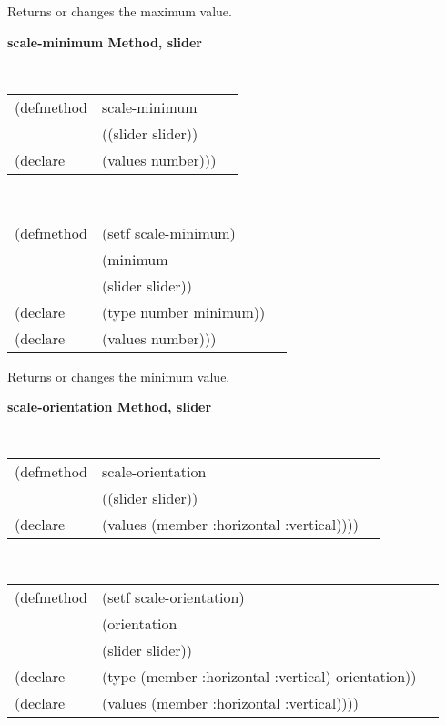 \begin{flushright} \parbox[t]{6.125in}{
Returns or changes the maximum value.}
\end{flushright}




{\samepage  
{\large {\bf scale-minimum \hfill Method, slider}}
\begin{flushright} \parbox[t]{6.125in}{
\tt
\begin{tabular}{lll}
\raggedright
(defmethod & scale-minimum & \\
& ((slider  slider)) \\
(declare & (values number)))
\end{tabular}
\rm

}\end{flushright}}

\begin{flushright} \parbox[t]{6.125in}{
\tt
\begin{tabular}{lll}
\raggedright
(defmethod & (setf scale-minimum) & \\
         & (minimum \\
         & (slider  slider)) \\
(declare &(type number  minimum))\\
(declare & (values number)))
\end{tabular}
\rm}
\end{flushright}

\begin{flushright} \parbox[t]{6.125in}{
Returns or changes the minimum value.}
\end{flushright}




{\samepage  
{\large {\bf scale-orientation \hfill Method, slider}}
\begin{flushright} \parbox[t]{6.125in}{
\tt
\begin{tabular}{lll}
\raggedright
(defmethod & scale-orientation & \\
& ((slider  slider)) \\
(declare & (values (member :horizontal :vertical))))
\end{tabular}
\rm

}\end{flushright}}

\begin{flushright} \parbox[t]{6.125in}{
\tt
\begin{tabular}{lll}
\raggedright
(defmethod & (setf scale-orientation) & \\
         & (orientation \\
         & (slider  slider)) \\
(declare &(type (member :horizontal :vertical)  orientation))\\
(declare & (values (member :horizontal :vertical))))
\end{tabular}
\rm}
\end{flushright}

